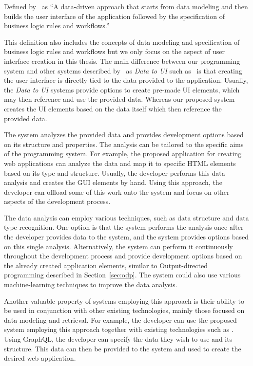 \begin{defn}[Data to UI]
	Defined by~\citet{Sahay_Indamutsa_Di} as ``A data-driven approach that starts from data modeling and then builds the user interface of the application followed by the specification of business logic rules and workflows.''
\end{defn}

This definition also includes the concepts of data modeling and specification of business logic rules and workflows but we only focus on the aspect of user interface creation in this thesis.
The main difference between our programming system and other systems described by~\citet{Sahay_Indamutsa_Di} as \emph{Data to UI} such as~\citet{mendix} is that creating the user interface is directly tied to the data provided to the application.
Usually, the \emph{Data to UI} systems provide options to create pre-made UI elements, which may then reference and use the provided data.
Whereas our proposed system creates the UI elements based on the data itself which then reference the provided data.

The system analyzes the provided data and provides development options based on its structure and properties.
The analysis can be tailored to the specific aims of the programming system.
For example, the proposed application for creating web applications can analyze the data and map it to specific HTML elements based on its type and structure.
Usually, the developer performs this data analysis and creates the GUI elements by hand.
Using this approach, the developer can offload some of this work onto the system and focus on other aspects of the development process.

The data analysis can employ various techniques, such as data structure and data type recognition.
One option is that the system performs the analysis once after the developer provides data to the system, and the system provides options based on this single analysis.
Alternatively, the system can perform it continuously throughout the development process and provide development options based on the already created application elements, similar to Output-directed programming described in Section~\ref{sec:odp}.
The system could also use various machine-learning techniques to improve the data analysis.

Another valuable property of systems employing this approach is their ability to be used in conjunction with other existing technologies, mainly those focused on data modeling and retrieval.
For example, the developer can use the proposed system employing this approach together with existing technologies such as \citet{graphql}.
Using GraphQL, the developer can specify the data they wish to use and its structure.
This data can then be provided to the system and used to create the desired web application.

